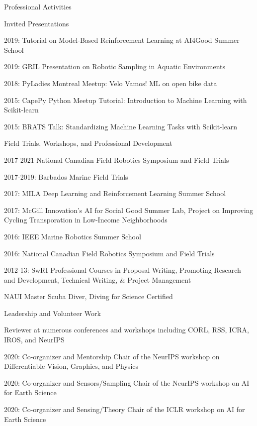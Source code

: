 \documentclass{resume} %
\begin{document}
\begin{rSection}{Professional Activities}
\begin{rSubsection}{Invited Presentations}{}{}{}
\item{2019: Tutorial on Model-Based Reinforcement Learning at AI4Good Summer School}
\item{2019: GRIL Presentation on Robotic Sampling in Aquatic Environments}	
\item{2018: PyLadies Montreal Meetup: Velo Vamos! ML on open bike data}
\item{2015: CapePy Python Meetup Tutorial: Introduction to Machine Learning with Scikit-learn }
\item{2015: BRATS Talk: Standardizing Machine Learning Tasks with Scikit-learn }
\end{rSubsection}
\newpage
\begin{rSubsection}{Field Trials, Workshops, and Professional Development}{}{}{}
\item{2017-2021 National Canadian Field Robotics Symposium and Field Trials}
\item{2017-2019: Barbados Marine Field Trials}
\item{2017: MILA Deep Learning and Reinforcement Learning Summer School}
\item{2017: McGill Innovation's AI for Social Good Summer Lab, Project on Improving Cycling Transporation in Low-Income Neighborhoods}
\item{2016: IEEE Marine Robotics Summer School}
\item{2016: National Canadian Field Robotics Symposium and Field Trials}
\item{2012-13: SwRI Professional Courses in Proposal Writing, Promoting Research and Development, Technical Writing, \& Project Management}
\item{NAUI Master Scuba Diver, Diving for Science Certified}
\end{rSubsection}
\vspace{-.2cm}
\begin{rSubsection}{Leadership and Volunteer Work}{}{}{}
\item{Reviewer at numerous conferences and workshops including CORL, RSS, ICRA, IROS, and NeurIPS}
\item{2020: Co-organizer and Mentorship Chair of the NeurIPS workshop on Differentiable Vision, Graphics, and Physics}
\item{2020: Co-organizer and Sensors/Sampling Chair of the NeurIPS workshop on AI for Earth Science}
\item{2020: Co-organizer and Sensing/Theory Chair of the ICLR workshop on AI for Earth Science}

\end{rSubsection}
\end{rSection}
\end{document}
